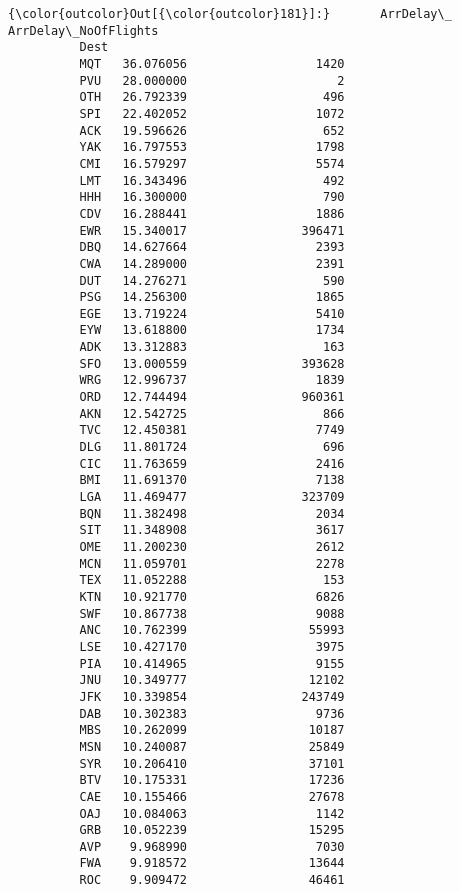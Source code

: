 \documentclass[11pt]{article}
\begin{document}
\begin{Verbatim}[commandchars=\\\{\}]
{\color{outcolor}Out[{\color{outcolor}181}]:}       ArrDelay\_  ArrDelay\_NoOfFlights
          Dest                                 
          MQT   36.076056                  1420
          PVU   28.000000                     2
          OTH   26.792339                   496
          SPI   22.402052                  1072
          ACK   19.596626                   652
          YAK   16.797553                  1798
          CMI   16.579297                  5574
          LMT   16.343496                   492
          HHH   16.300000                   790
          CDV   16.288441                  1886
          EWR   15.340017                396471
          DBQ   14.627664                  2393
          CWA   14.289000                  2391
          DUT   14.276271                   590
          PSG   14.256300                  1865
          EGE   13.719224                  5410
          EYW   13.618800                  1734
          ADK   13.312883                   163
          SFO   13.000559                393628
          WRG   12.996737                  1839
          ORD   12.744494                960361
          AKN   12.542725                   866
          TVC   12.450381                  7749
          DLG   11.801724                   696
          CIC   11.763659                  2416
          BMI   11.691370                  7138
          LGA   11.469477                323709
          BQN   11.382498                  2034
          SIT   11.348908                  3617
          OME   11.200230                  2612
          MCN   11.059701                  2278
          TEX   11.052288                   153
          KTN   10.921770                  6826
          SWF   10.867738                  9088
          ANC   10.762399                 55993
          LSE   10.427170                  3975
          PIA   10.414965                  9155
          JNU   10.349777                 12102
          JFK   10.339854                243749
          DAB   10.302383                  9736
          MBS   10.262099                 10187
          MSN   10.240087                 25849
          SYR   10.206410                 37101
          BTV   10.175331                 17236
          CAE   10.155466                 27678
          OAJ   10.084063                  1142
          GRB   10.052239                 15295
          AVP    9.968990                  7030
          FWA    9.918572                 13644
          ROC    9.909472                 46461
\end{Verbatim}
            
\end{document}
